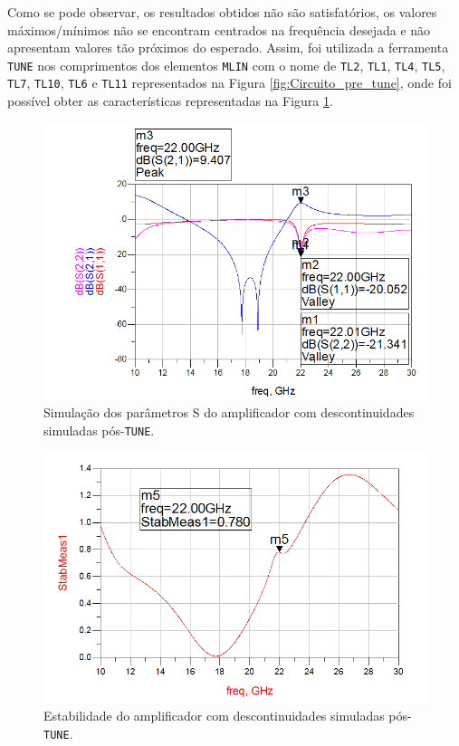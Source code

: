 \documentclass[11pt]{article}
\numberwithin{equation}{section}
\begin{document}
Como se pode observar, os resultados obtidos não são satisfatórios, os valores máximos/mínimos não se encontram centrados na frequência desejada e não apresentam valores tão próximos do esperado. Assim, foi utilizada a ferramenta \texttt{TUNE} nos comprimentos dos elementos \texttt{MLIN} com o nome de \texttt{TL2}, \texttt{TL1}, \texttt{TL4}, \texttt{TL5}, \texttt{TL7}, \texttt{TL10}, \texttt{TL6} e \texttt{TL11} representados na Figura \ref{fig:Circuito_pre_tune}, onde foi possível obter as características representadas na Figura \ref{fig:descont_S_pos_tune}.

\begin{figure}[H]
	\centering
	\includegraphics[keepaspectratio=true, scale=0.45]{exps/descont_S_pos_tune}
	\vspace{-0.5em}
	\caption{Simulação dos parâmetros S do amplificador com descontinuidades simuladas pós-\texttt{TUNE}.}
	\vspace{-0.8em}
	\label{fig:descont_S_pos_tune}
\end{figure}

\begin{figure}[H]
	\centering
	\includegraphics[keepaspectratio=true, scale=0.45]{exps/descont_estab_pos_tune}
	\vspace{-0.5em}
	\caption{Estabilidade do amplificador com descontinuidades simuladas pós-\texttt{TUNE}.}
	\vspace{-0.8em}
	\label{fig:descont_estab_pos_tune}
\end{figure}
\end{document}
